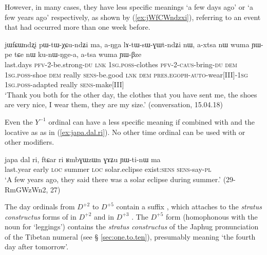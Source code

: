However, in many cases, they have less specific meanings `a few days ago' or `a few years ago' respectively,  as shown by (\ref{ex:jWfCWndzxi}), referring to an event that had occurred more than one week before.

\begin{exe}
\ex \label{ex:jWfCWndzxi}
\gll jɯfɕɯndʐi pɯ-tɯ-χɕu-ndʑi ma, a-ŋga lɤ-tɯ-sɯ-ɣɯt-ndʑi nɯ, a-xtsa nɯ wuma ɲɯ-pe tɕe nɯ ku-nɯ-ŋge-a,  a-tsa wuma ɲɯ-βze \\ 
last.days \textsc{pfv}-2-be.strong-\textsc{du} \textsc{lnk} \textsc{1sg}.\textsc{poss}-clothes \textsc{pfv}-2-\textsc{caus}-bring-\textsc{du} \textsc{dem} \textsc{1sg}.\textsc{poss}-shoe \textsc{dem} really \textsc{sens}-be.good \textsc{lnk} \textsc{dem} \textsc{pres}.\textsc{egoph}-\textsc{auto}-wear[III]-\textsc{1sg}  \textsc{1sg}.\textsc{poss}-adapted really \textsc{sens}-make[III] \\
\glt `Thank you both for the other day, the clothes that you have sent me, the shoes are very nice, I wear them, they are my size.' (conversation, 15.04.18)
\end{exe}

Even the $Y^{-1}$ ordinal  can have a less specific meaning if combined with  and the locative  as  as in (\ref{ex:japa.dal.ri}). No other time ordinal can be used with  or other modifiers.

\begin{exe}
\ex \label{ex:japa.dal.ri}
\gll japa dal ri, ftɕar ri  ʁmbɣɯzɯn ɣɤʑu ɲɯ-ti-nɯ ma \\
 last.year early \textsc{loc} summer \textsc{loc} solar.eclipse exist:\textsc{sens} \textsc{sens}-say-\textsc{pl} \\
\glt `A few years ago, they said there was a solar eclipse during summer.' (29-RmGWzWn2, 27)
\end{exe}

The day ordinals from $D^{+2}$ to $D^{+5}$ contain a suffix , which attaches to the \textit{stratus constructus} forms of  in $D^{+2}$  and  in $D^{+3}$ . The $D^{+5}$ form  (homophonous with the noun for `leggings') contains the \textit{stratus constructus}  of the Japhug pronunciation  of the Tibetan numeral   (see § \ref{sec:one.to.ten}), presumably meaning `the fourth day after tomorrow'.

